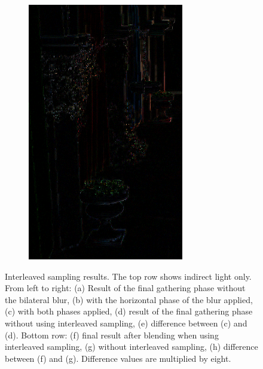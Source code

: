 \begin{figure}[htb]
\begin{subfigure}[b]{0.333\textwidth}
        \includegraphics[width=.95\textwidth]{screenshots/interleaved_difference_shaded}%
        \caption{}
        \label{fig:results:interleaved_difference_shaded}%
    \end{subfigure}%

      \caption{Interleaved sampling results. The top row shows indirect light only. From left to right: (a) Result of the final gathering phase without the bilateral blur, (b) with the horizontal phase of the blur applied, (c) with both phases applied, (d) result of the final gathering phase without using interleaved sampling, (e) difference between (c) and (d). Bottom row: (f) final result after blending when using interleaved sampling, (g) without interleaved sampling, (h) difference between (f) and (g). Difference values are multiplied by eight.}
      \label{fig:results:interleaved_quality}
\end{figure}


